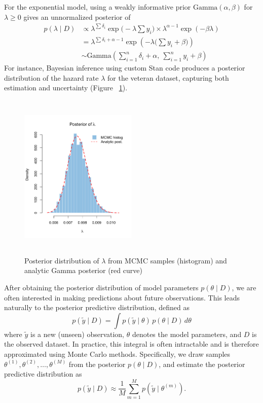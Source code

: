 For the exponential model, using a weakly informative prior $\text{Gamma}(\alpha, \beta)$ for $\lambda \ge 0$ gives an unnormalized posterior of 
\begin{align}
p(\lambda\mid D)
&\propto
\lambda^{\sum \delta_i}
\exp\Big(-\lambda \sum y_i\Big)
\times
\lambda^{\alpha - 1}
\exp(-\beta \lambda)\\
&=\lambda^{\sum \delta_i + \alpha - 1}
\exp \left( - \lambda \big(\sum y_i + \beta\big) \right) \\
&\sim
\text{Gamma}
\left(
\sum_{i=1}^{n} \delta_i + \alpha,\ \sum_{i=1}^{n} y_i + \beta
\right)
\label{eq:17}
\end{align}
For instance, Bayesian inference using custom Stan code produces a posterior distribution of the hazard rate $\lambda$ for the veteran dataset, capturing both estimation and uncertainty (Figure ~\ref{fig:exp veteran}).
\begin{figure}[H]
    \centering
    \includegraphics[height=8cm, width=0.5\textwidth]{MSc_Statistics_Research_Report_paper/images/直方图.png}
    \caption{Posterior distribution of $\lambda$ from MCMC samples (histogram) and analytic Gamma posterior (red curve)}
    \label{fig:exp veteran}
\end{figure}
After obtaining the posterior distribution of model parameters $p(\theta \mid D)$, we are often interested in making predictions about future observations. This leads naturally to the posterior predictive distribution, defined as
\begin{equation}
    p(\tilde{y} \mid D) = \int p(\tilde{y} \mid \theta)\, p(\theta \mid D)\, d\theta
    \label{eq:18}
\end{equation}
where $\tilde{y}$ is a new (unseen) observation, $\theta$ denotes the model parameters, and $D$ is the observed dataset. In practice, this integral is often intractable and is therefore approximated using Monte Carlo methods. Specifically, we draw samples $\theta^{(1)}, \theta^{(2)}, \dots, \theta^{(M)}$ from the posterior $p(\theta \mid D)$, and estimate the posterior predictive distribution as
\begin{equation}
p(\tilde{y} \mid D) \approx \frac{1}{M} \sum_{m=1}^{M} p(\tilde{y} \mid \theta^{(m)}).
\end{equation}





